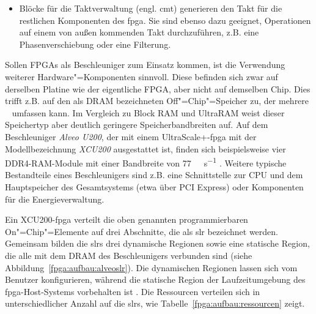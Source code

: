 \begin{itemize}
          Ausführung fundamentaler mathematischer oder bitweiser Operationen der
          Signal-, Bild- und Videoverarbeitung besonders gut geeignet sind. Aus
          mehreren \gls{dsp}s lassen sich durch Verbindungen komplexere
          arithmetische Funktionen generieren.
          \cite[vgl.][7--8]{ultrascaledsp2019}
    \item Blöcke für die Taktverwaltung (engl. \gls{cmt}) generieren den Takt
          für die restlichen Komponenten des \gls{fpga}. Sie sind ebenso dazu
          geeignet, Operationen auf einem von außen kommenden Takt
          durchzuführen, z.B. eine Phasenverschiebung oder eine Filterung.
          \cite[vgl.][35--40]{ultrascaleclock2018}
\end{itemize}

Sollen FPGAs als Beschleuniger zum Einsatz kommen, ist die Verwendung weiterer
Hardware"=Komponenten sinnvoll. Diese befinden sich zwar auf derselben Platine
wie der eigentliche FPGA, aber nicht auf demselben Chip. Dies trifft z.B. auf
den als DRAM bezeichneten Off"=Chip"=Speicher zu, der mehrere \si{\gibi\byte}
umfassen kann. Im Vergleich zu Block RAM und UltraRAM weist dieser Speichertyp
aber deutlich geringere Speicherbandbreiten auf. Auf dem Beschleuniger
\textit{Alveo U200}, der mit einem UltraScale+-\gls{fpga} mit der
Modellbezeichnung \textit{XCU200} ausgestattet ist, finden sich beispielsweise
vier DDR4-RAM-Module mit einer Bandbreite von \SI{77}{\gibi\byte\per\second}
\cites[vgl.][3]{alveo2019}[2]{alveobrief2018}. Weitere typische Bestandteile
eines Beschleunigers sind z.B. eine Schnittstelle zur CPU und dem Hauptspeicher
des Gesamtsystems (etwa über PCI Express) oder Komponenten für die Energieverwaltung.

Ein XCU200-\gls{fpga} verteilt die oben genannten programmierbaren
On"=Chip"=Elemente auf drei Abschnitte, die als \gls{slr} bezeichnet werden.
Gemeinsam bilden die \gls{slr}s drei dynamische Regionen sowie eine statische
Region, die alle mit dem DRAM des Beschleunigers verbunden sind
(siehe Abbildung~\ref{fpga:aufbau:alveoslr}). Die dynamischen Regionen lassen
sich vom Benutzer konfigurieren, während die statische Region der
Laufzeitumgebung des \gls{fpga}-Host-Systems vorbehalten ist
\cite[vgl.][4]{alveo2019}. Die Ressourcen verteilen sich in unterschiedlicher
Anzahl auf die \gls{slr}s, wie Tabelle~\ref{fpga:aufbau:ressourcen} zeigt.


